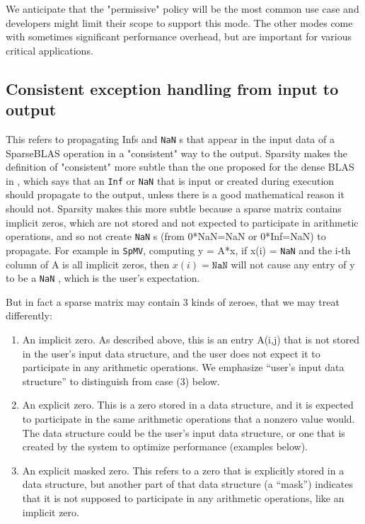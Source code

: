 \documentclass[manuscript,review]{acmart}
\begin{document}
We anticipate that the "permissive" policy will be the most common use case and developers might limit their scope to support this mode. The other modes come with sometimes significant performance overhead, but are important for various critical applications.

\fi

\subsection{Consistent exception handling from
input to output}

This refers to propagating Infs and \texttt{NaN} s that appear in the input data of a SparseBLAS
operation in a "consistent" way to the output. Sparsity makes the definition of "consistent"
more subtle than the one proposed for the dense BLAS in \cite{Proposed_BLAS_LAPACK_exception_handling}, which says that an \texttt{Inf} or \texttt{NaN} 
that is input or created during execution should propagate to the output, unless there
is a good mathematical reason it should not. Sparsity makes this more subtle because
a sparse matrix contains implicit zeros, which are not stored and not expected to participate in
arithmetic operations, and so not create \texttt{NaN} s (from 0*NaN=NaN or 0*Inf=NaN) to
propagate. For example in \texttt{SpMV}, computing y = A*x, if x(i) = \texttt{NaN}  and the i-th column
of A is all implicit zeros, then $x(i)=\texttt{NaN}$ will not cause any entry of y to be a \texttt{NaN} , which
is the user's expectation. 

But in fact a sparse matrix may contain 3 kinds of zeroes, that we may treat differently:
\begin{enumerate}
\item An implicit zero. As described above, this is an entry A(i,j) that is not stored in the 
user's input data structure, and the user does not expect it to participate in any
arithmetic operations. We emphasize ``user's input data structure'' to distinguish
from case (3) below.
\item An explicit zero. This is a zero stored in a data structure, and it is
expected to participate in the same arithmetic operations that a nonzero value would.
The data structure could be the user's input data structure, or one that is created by
the system to optimize performance (examples below).
\item An explicit masked zero. This refers to a zero that is explicitly stored in a data structure,
but another part of that data structure (a ``mask'') indicates that it is not supposed to
participate in any arithmetic operations, like an implicit zero. 
\end{enumerate}
\end{document}
